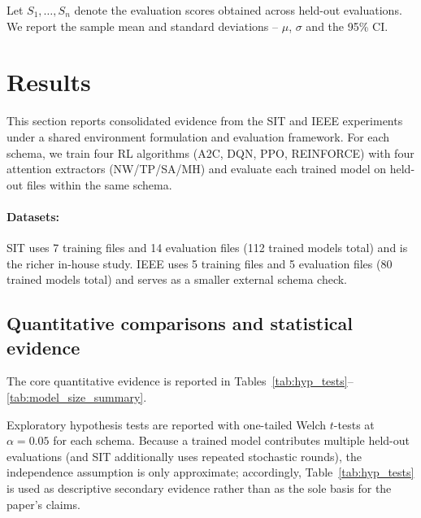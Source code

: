 \documentclass[sn-vancouver-num]{sn-jnl}%
\begin{document}
Let $S_1,\ldots,S_n$ denote the evaluation scores obtained across held-out evaluations. We report the sample mean and standard deviations -- $\mu$, $\sigma$ and the 95\% CI.

\section{Results} \label{sec:results}
This section reports consolidated evidence from the SIT and IEEE experiments under a shared environment formulation and evaluation framework. For each schema, we train four RL algorithms (\textsc{A2C}, \textsc{DQN}, \textsc{PPO}, \textsc{REINFORCE}) with four attention extractors (NW/TP/SA/MH) and evaluate each trained model on held-out files within the same schema.

\paragraph{Datasets:}
SIT uses 7 training files and 14 evaluation files (112 trained models total) and is the richer in-house study. IEEE uses 5 training files and 5 evaluation files (80 trained models total) and serves as a smaller external schema check.

\subsection{Quantitative comparisons and statistical evidence}
\label{sec:hypothesis_tests}

The core quantitative evidence is reported in Tables~\ref{tab:hyp_tests}--\ref{tab:model_size_summary}.

Exploratory hypothesis tests are reported with one-tailed Welch $t$-tests at $\alpha=0.05$ for each schema. Because a trained model contributes multiple held-out evaluations (and SIT additionally uses repeated stochastic rounds), the independence assumption is only approximate; accordingly, Table~\ref{tab:hyp_tests} is used as descriptive secondary evidence rather than as the sole basis for the paper's claims.
\end{document}
